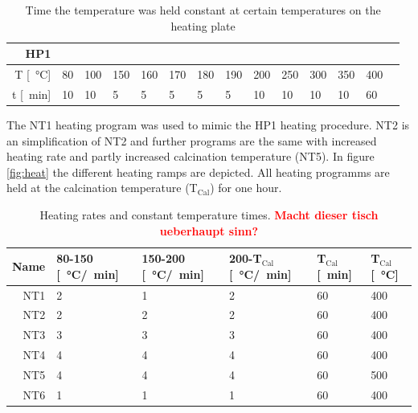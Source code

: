 \documentclass[a4paper]{article}
\newcommand{\td}[1]{\textbf{\textcolor{red}{#1}}}
\newcommand{\minutes}[1]{\SI{#1}{\minute}}
\newcommand{\oc}[1]{\SI{#1}{\degreeCelsius}}
\begin{document}
\begin{table}[h]
	\centering
	\begin{tabular}{rl ll ll ll ll ll ll }%
		HP1		&&&&&&&&&&&&&\\
		\hline
		T [\oc{}]	    &80		&100	&150	&160	&170 	&180	&190	&200	&250	&300	&350	&400	\\
		t [\minutes{}]	&10 	&10		&5 		&5 		&5 		&5 &5 &10 &10 &10 &10 &60 \\
		\hline
	\end{tabular}
	\caption{Time the temperature was held constant at certain temperatures on the heating plate}
	\label{tab:labtech}
\end{table}
%
The NT1 heating program was used to mimic the HP1 heating procedure. 
NT2 is an simplification of NT2 and further programs are the same with increased heating rate and partly increased calcination temperature (NT5).
In figure \ref{fig:heat} the different heating ramps are depicted. 
All heating programms are held at the calcination temperature (T$_{\textrm{Cal}}$) for one hour.
%
%
\begin{table}[h]
	\centering
	\begin{tabular}{rl ll ll}%
		\hline\hline
		Name	&80-150 [\oc{}/\minutes{}]	&150-200 [\oc{}/\minutes{}]	&200-T$_{\textrm{Cal}}$ [\oc{}/\minutes{}]	&T$_{\textrm{Cal}}$ [\minutes{}]	&T$_{\textrm{Cal}}$ [\oc{}] \\
		\hline
		NT1		&2					&1					&2					&60 &400 \\
		NT2		&2					&2					&2					&60 &400 \\
		NT3		&3					&3					&3					&60 &400 \\
		NT4		&4					&4					&4					&60 &400 \\
		NT5		&4					&4					&4					&60 &500 \\
		NT6		&1					&1					&1					&60 &400 \\
		\hline\hline
	\end{tabular}
	\caption{Heating rates and constant temperature times. \td{Macht dieser tisch ueberhaupt sinn? }}
	\label{tab:nt}
\end{table}
\end{document}

